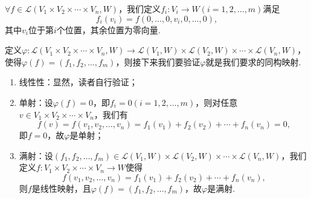 \begin{solution}
    $\forall f\in \mathcal{L}(V_1 \times V_2 \times \cdots \times V_n,W)$，我们定义$f_i:V_i\to W(i=1,2,\ldots,m)$满足
    \[f_i(v_i)=f(0,\ldots,0,v_i,0,\ldots,0),\]
    其中$v_i$位于第$i$个位置，其余位置为零向量.

    定义$\varphi:\mathcal{L}(V_1 \times V_2 \times \cdots \times V_n,W)\to \mathcal{L}(V_1,W) \times \mathcal{L}(V_2,W) \times \cdots \times \mathcal{L}(V_n,W)$，使得$\varphi(f)=(f_1,f_2,\ldots,f_m)$，则接下来我们要验证$\varphi$就是我们要求的同构映射.
    \begin{enumerate}
        \item 线性性：显然，读者自行验证；
        \item 单射：设$\varphi(f)=0$，即$f_i=0(i=1,2,\ldots,m)$，则对任意$v\in V_1 \times V_2 \times \cdots \times V_n$，我们有
              \[f(v)=f(v_1,v_2,\ldots,v_n)=f_1(v_1)+f_2(v_2)+\cdots+f_n(v_n)=0,\]
              即$f=0$，故$\varphi$是单射；
        \item 满射：设$(f_1,f_2,\ldots,f_m)\in \mathcal{L}(V_1,W) \times \mathcal{L}(V_2,W) \times \cdots \times \mathcal{L}(V_n,W)$，我们定义$f:V_1 \times V_2 \times \cdots \times V_n\to W$使得
              \[f(v_1,v_2,\ldots,v_n)=f_1(v_1)+f_2(v_2)+\cdots+f_n(v_n),\]
              则$f$是线性映射，且$\varphi(f)=(f_1,f_2,\ldots,f_m)$，故$\varphi$是满射.
    \end{enumerate}
\end{solution}

